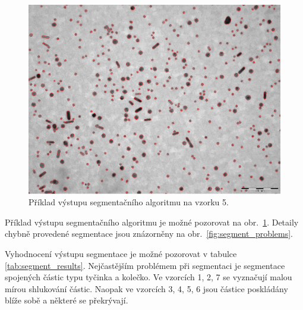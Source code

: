 \documentclass[11pt,twoside,a4paper,table]{book}
\begin{document}
\begin{figure}[ht]
	\centering
	\includegraphics[width=\textwidth]{figures/segment_result.png}	
	\caption{Příklad výstupu segmentačního algoritmu na vzorku 5.}
	\label{fig:segment_result}
\end{figure}

Příklad výstupu segmentačního algoritmu je možné pozorovat na obr.~\ref{fig:segment_result}. Detaily chybně provedené segmentace jsou znázorněny na obr.~\ref{fig:segment_problems}. 

Vyhodnocení výstupu segmentace je možné pozorovat v tabulce \ref{tab:segment_results}. Nejčastějším problémem při segmentaci je segmentace spojených částic typu tyčinka a kolečko.  Ve vzorcích 1, 2, 7 se vyznačují malou mírou shlukování částic. Naopak ve vzorcích 3, 4, 5, 6 jsou částice poskládány blíže sobě a některé se překrývají.
\end{document}
